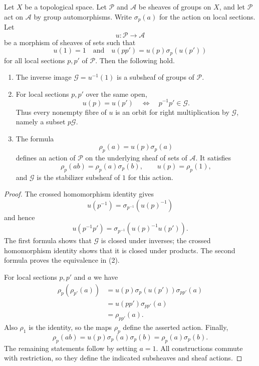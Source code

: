 \begin{lemma}
\label{lemma-crossed-homomorphism-affine-action}
\begin{reference}
\cite[Chapter III, \S 3.4, p. 164]{Tohoku}
\end{reference}
Let $X$ be a topological space. Let $\mathcal P$ and $\mathcal A$ be
sheaves of groups on $X$, and let $\mathcal P$ act on $\mathcal A$ by
group automorphisms. Write $\sigma_p(a)$ for the action on local sections.
Let
$$
u : \mathcal P \longrightarrow \mathcal A
$$
be a morphism of sheaves of sets such that
$$
u(1)=1
\quad\text{and}\quad
u(pp')=u(p)\sigma_p(u(p'))
$$
for all local sections $p,p'$ of $\mathcal P$. Then the following hold.
\begin{enumerate}
\item The inverse image $\mathcal G=u^{-1}(1)$ is a subsheaf of groups of
$\mathcal P$.
\item For local sections $p,p'$ over the same open,
$$
u(p)=u(p')
\quad\Longleftrightarrow\quad
p^{-1}p'\in\mathcal G.
$$
Thus every nonempty fibre of $u$ is an orbit for right multiplication by
$\mathcal G$, namely a subset $p\mathcal G$.
\item The formula
$$
\rho_p(a)=u(p)\sigma_p(a)
$$
defines an action of $\mathcal P$ on the underlying sheaf of sets of
$\mathcal A$. It satisfies
$$
\rho_p(ab)=\rho_p(a)\sigma_p(b),
\qquad
u(p)=\rho_p(1),
$$
and $\mathcal G$ is the stabilizer subsheaf of $1$ for this action.
\end{enumerate}
\end{lemma}

\begin{proof}
The crossed homomorphism identity gives
$$
u(p^{-1})=\sigma_{p^{-1}}(u(p)^{-1})
$$
and hence
$$
u(p^{-1}p')
=\sigma_{p^{-1}}(u(p)^{-1}u(p')).
$$
The first formula shows that $\mathcal G$ is closed under inverses; the
crossed homomorphism identity shows that it is closed under products. The
second formula proves the equivalence in (2).

For local sections $p,p'$ and $a$ we have
\begin{align*}
\rho_p(\rho_{p'}(a))
&=u(p)\sigma_p(u(p'))\sigma_{pp'}(a) \\
&=u(pp')\sigma_{pp'}(a) \\
&=\rho_{pp'}(a).
\end{align*}
Also $\rho_1$ is the identity, so the maps $\rho_p$ define the asserted
action. Finally,
$$
\rho_p(ab)
=u(p)\sigma_p(a)\sigma_p(b)
=\rho_p(a)\sigma_p(b).
$$
The remaining statements follow by setting $a=1$. All constructions commute
with restriction, so they define the indicated subsheaves and sheaf actions.
\end{proof}

